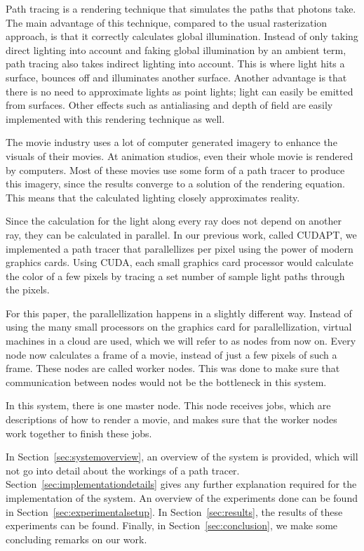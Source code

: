 Path tracing is a rendering technique that simulates the paths that photons take.
The main advantage of this technique, compared to the usual rasterization approach, is that it correctly calculates global illumination.
Instead of only taking direct lighting into account and faking global illumination by an ambient term, path tracing also takes indirect lighting into account.
This is where light hits a surface, bounces off and illuminates another surface.
Another advantage is that there is no need to approximate lights as point lights; light can easily be emitted from surfaces.
Other effects such as antialiasing and depth of field are easily implemented with this rendering technique as well.

The movie industry uses a lot of computer generated imagery to enhance the visuals of their movies.
At animation studios, even their whole movie is rendered by computers.
Most of these movies use some form of a path tracer to produce this imagery, since the results converge to a solution of the rendering equation\cite{kajiya}.
This means that the calculated lighting closely approximates reality.

Since the calculation for the light along every ray does not depend on another ray, they can be calculated in parallel.
In our previous work, called CUDAPT\cite{cudapt}, we implemented a path tracer that parallellizes per pixel using the power of modern graphics cards.
Using CUDA, each small graphics card processor would calculate the color of a few pixels by tracing a set number of sample light paths through the pixels.

For this paper, the parallellization happens in a slightly different way.
Instead of using the many small processors on the graphics card for parallellization, virtual machines in a cloud are used, which we will refer to as nodes from now on.
Every node now calculates a frame of a movie, instead of just a few pixels of such a frame.
These nodes are called worker nodes.
This was done to make sure that communication between nodes would not be the bottleneck in this system.

In this system, there is one master node.
This node receives jobs, which are descriptions of how to render a movie, and makes sure that the worker nodes work together to finish these jobs.

In Section~\ref{sec:systemoverview}, an overview of the system is provided, which will not go into detail about the workings of a path tracer.
Section~\ref{sec:implementationdetails} gives any further explanation required for the implementation of the system.
An overview of the experiments done can be found in Section~\ref{sec:experimentalsetup}.
In Section~\ref{sec:results}, the results of these experiments can be found.
Finally, in Section~\ref{sec:conclusion}, we make some concluding remarks on our work.

